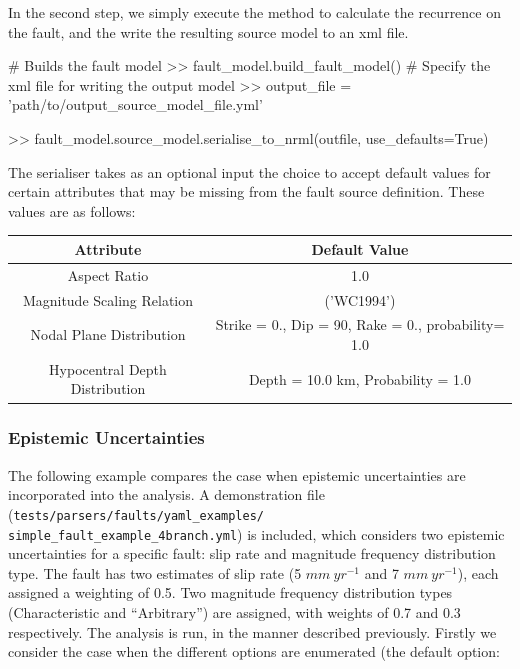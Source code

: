 In the second step, we simply execute the method to calculate the recurrence on the fault, and the write the resulting source model to an xml file. 

\begin{python}[frame=single]
# Builds the fault model
>> fault_model.build_fault_model()
# Specify the xml file for writing the output model
>> output_file  = 'path/to/output_source_model_file.yml'

>> fault_model.source_model.serialise_to_nrml(outfile,
                                              use_defaults=True)
\end{python}

The serialiser takes as an optional input the choice to accept default values for certain attributes that may be missing from the fault source definition. These values are as follows:

\begin{table}[h]
\begin{tabular}{|c|c|} \hline
\textbf{Attribute} & \textbf{Default Value} \\ \hline
Aspect Ratio & 1.0 \\
Magnitude Scaling Relation & \cite{wells1994} ('WC1994') \\
Nodal Plane Distribution & Strike = 0., Dip = 90, Rake = 0., probability= 1.0\\
Hypocentral Depth Distribution & Depth = 10.0 km, Probability = 1.0 \\ \hline

\end{tabular}

\end{table}

\subsubsection{Epistemic Uncertainties}

The following example compares the case when epistemic uncertainties are incorporated into the analysis. A demonstration file (\verb=tests/parsers/faults/yaml_examples/=\\
\verb=simple_fault_example_4branch.yml=) is included, which considers two epistemic uncertainties for a specific fault: slip rate and magnitude frequency distribution type. The fault has two estimates of slip rate (5 $mm \ yr^{-1}$ and 7 $mm\ yr^{-1}$), each assigned a weighting of 0.5. Two magnitude frequency distribution types (Characteristic and \textcite{AndersonLuco1983} ``Arbitrary'') are assigned, with weights of 0.7 and 0.3 respectively. The analysis is run, in the manner described previously. Firstly we consider the case when the different options are enumerated (the default option:

